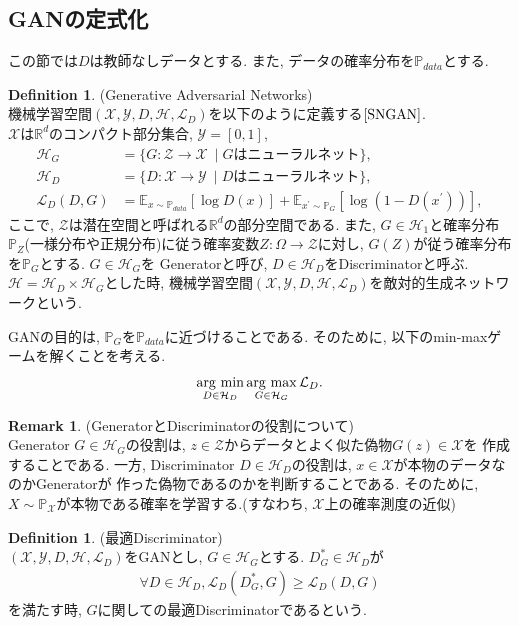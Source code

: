 \documentclass[11pt, a4paper, dvipdfmx]{jsarticle}
\theoremstyle{definition}
\newtheorem{Definition+}[Axiom+]{Definition}
\newtheorem{Remark+}[Axiom+]{Remark}
\newcommand{\R}{\mathbb{R}}
\newcommand{\X}{\mathcal{X}}
\newcommand{\Y}{\mathcal{Y}}
\newcommand{\Hil}{\mathcal{H}}
\newcommand{\Loss}{\mathcal{L}_{D}}
\newcommand{\MLsp}{(\X, \Y, D, \Hil, \Loss)}
\newcommand{\argmax}{\mathop{\rm arg~max}\limits}
\newcommand{\argmin}{\mathop{\rm arg~min}\limits}
\begin{document}
\subsection{GANの定式化}
この節では$D$は教師なしデータとする. また, データの確率分布を$\mathbb{P}_{data}$とする. 
\begin{Definition+}(Generative Adversarial Networks)\\
    機械学習空間$\MLsp$を以下のように定義する$\cite{SNGAN}$. \\ 
    $\X\text{は}\R^{d}\text{のコンパクト部分集合}$, $\Y = [0, 1]$, 
    \begin{align*}
        \Hil_{G} &= \{G:\mathcal{Z}\to\X~\mid G\text{はニューラルネット}\},\\
        \Hil_{D} &= \{D:\X\to\Y~\mid D\text{はニューラルネット}\},\\
        \Loss(D, G) &= \mathbb{E}_{x\sim \mathbb{P}_{data}}[\log D(x)] + \mathbb{E}_{x^{\prime}\sim \mathbb{P}_{G}}[\log(1 - D(x^{\prime}))],
    \end{align*}
    ここで, $\mathcal{Z}$は潜在空間と呼ばれる$\R^d$の部分空間である. 
    また, $G\in\Hil_{1}$と確率分布$\mathbb{P}_{Z}$(一様分布や正規分布)に従う確率変数$Z:\Omega\to\mathcal{Z}$に対し, $G(Z)$が従う確率分布を$\mathbb{P}_{G}$とする. $G\in\Hil_{G}$を
    Generatorと呼び, $D\in\Hil_{D}$をDiscriminatorと呼ぶ.
    $\Hil = \Hil_{D}\times\Hil_{G}$とした時, 機械学習空間$\MLsp$を敵対的生成ネットワークという. 
\end{Definition+}
GANの目的は, $\mathbb{P}_{G}$を$\mathbb{P}_{data}$に近づけることである. そのために, 以下のmin-maxゲームを解くことを考える. 
\begin{align*}
    \argmin_{D\in\Hil_{D}}\argmax_{G\in\Hil_{G}}\Loss.
\end{align*}
\begin{Remark+}(GeneratorとDiscriminatorの役割について)\\
    Generator $G\in\Hil_{G}$の役割は, $z\in\mathcal{Z}$からデータとよく似た偽物$G(z)\in\X$を
    作成することである. 一方, Discriminator $D\in\Hil_{D}$の役割は, $x\in\X$が本物のデータなのかGeneratorが
    作った偽物であるのかを判断することである. そのために, $X\sim\mathbb{P}_{\X}$が本物である確率を学習する.(すなわち, $\X$上の確率測度の近似)
\end{Remark+}
\begin{Definition+}(最適Discriminator)\\
    $\MLsp$をGANとし, $G\in\Hil_{G}$とする. $D_{G}^{*}\in\Hil_{D}$が
    \begin{align*}
        \forall D\in\Hil_{D}, \Loss(D_{G}^{*}, G) \geq \Loss(D, G)
    \end{align*}
    を満たす時, $G$に関しての最適Discriminatorであるという.
\end{Definition+}
\end{document}
